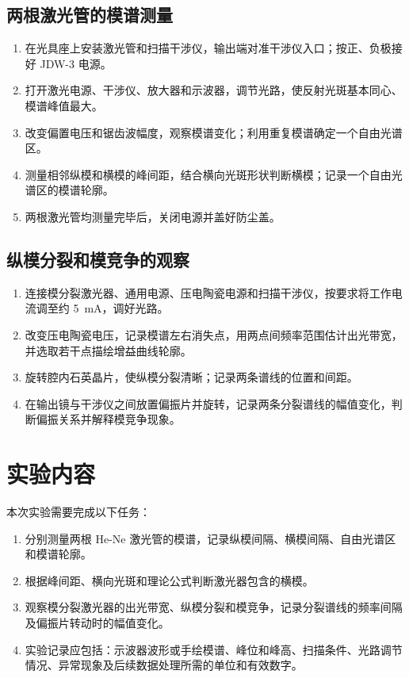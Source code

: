 \documentclass[UTF8,a4paper,10pt]{ctexart}
\begin{document}
\subsection{两根激光管的模谱测量}

\begin{enumerate}
  \item 在光具座上安装激光管和扫描干涉仪，输出端对准干涉仪入口；按正、负极接好 JDW-3 电源。
  \item 打开激光电源、干涉仪、放大器和示波器，调节光路，使反射光斑基本同心、模谱峰值最大。
  \item 改变偏置电压和锯齿波幅度，观察模谱变化；利用重复模谱确定一个自由光谱区。
  \item 测量相邻纵模和横模的峰间距，结合横向光斑形状判断横模；记录一个自由光谱区的模谱轮廓。
  \item 两根激光管均测量完毕后，关闭电源并盖好防尘盖。
\end{enumerate}

\subsection{纵模分裂和模竞争的观察}

\begin{enumerate}
  \item 连接模分裂激光器、通用电源、压电陶瓷电源和扫描干涉仪，按要求将工作电流调至约 \SI{5}{\milli\ampere}，调好光路。
  \item 改变压电陶瓷电压，记录模谱左右消失点，用两点间频率范围估计出光带宽，并选取若干点描绘增益曲线轮廓。
  \item 旋转腔内石英晶片，使纵模分裂清晰；记录两条谱线的位置和间距。
  \item 在输出镜与干涉仪之间放置偏振片并旋转，记录两条分裂谱线的幅值变化，判断偏振关系并解释模竞争现象。
\end{enumerate}

\section{实验内容}

本次实验需要完成以下任务：
\begin{enumerate}
  \item 分别测量两根 He-Ne 激光管的模谱，记录纵模间隔、横模间隔、自由光谱区和模谱轮廓。
  \item 根据峰间距、横向光斑和理论公式判断激光器包含的横模。
  \item 观察模分裂激光器的出光带宽、纵模分裂和模竞争，记录分裂谱线的频率间隔及偏振片转动时的幅值变化。
  \item 实验记录应包括：示波器波形或手绘模谱、峰位和峰高、扫描条件、光路调节情况、异常现象及后续数据处理所需的单位和有效数字。
\end{enumerate}
\end{document}
